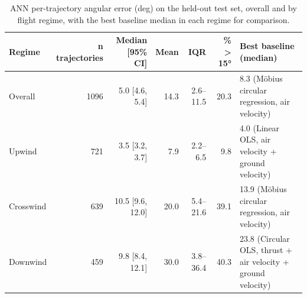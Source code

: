 \begin{table}[h!]
    \centering
    \caption{ANN per-trajectory angular error (deg) on the held-out test set, overall and by flight regime, with the best baseline median in each regime for comparison.}
    \label{tab:ann_regime}
    \begin{tabular}{@{}lrrrrrl@{}}
        \toprule
        Regime & n trajectories & Median [95\% CI] & Mean & IQR & \% > 15° & Best baseline (median) \\
        \midrule
        Overall & 1096 & 5.0 [4.6, 5.4] & 14.3 & 2.6–11.5 & 20.3 & 8.3 (Möbius circular regression, air velocity) \\
        Upwind & 721 & 3.5 [3.2, 3.7] & 7.9 & 2.2–6.5 & 9.8 & 4.0 (Linear OLS, air velocity + ground velocity) \\
        Crosswind & 639 & 10.5 [9.6, 12.0] & 20.0 & 5.4–21.6 & 39.1 & 13.9 (Möbius circular regression, air velocity) \\
        Downwind & 459 & 9.8 [8.4, 12.1] & 30.0 & 3.8–36.4 & 40.3 & 23.8 (Circular OLS, thrust + air velocity + ground velocity) \\
        \bottomrule
    \end{tabular}
\end{table}

